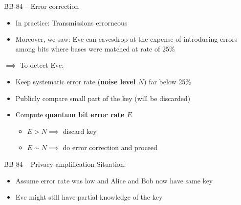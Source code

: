\documentclass{beamer}
\begin{document}
	\begin{frame}{BB-84 – Error correction}
		\begin{itemize}
			\item In practice: Transmissions errorneous
			\item Moreover, we saw: Eve can eavesdrop at the expense of
			introducing errors among bits where bases were matched at
			rate of 25\%
		\end{itemize}
		$\implies$ To detect Eve:
		\begin{itemize}
			\item Keep systematic error rate (\textbf{noise level $N$})
			far below 25\%
			\item Publicly compare small part of the key (will be discarded)
			\item Compute \textbf{quantum bit error rate $E$}
			\begin{itemize}
				\item $E > N \implies$ discard key
				\item $E \sim N \implies$ do error correction and proceed
			\end{itemize}
		\end{itemize}
	\end{frame}

	\begin{frame}{BB-84 – Privacy amplification}
		Situation:
		\begin{itemize}
			\item Assume error rate was low and Alice and Bob now have
			same key
			\item Eve might still have partial knowledge of the key
		\end{itemize}

	\end{frame}
\end{document}
